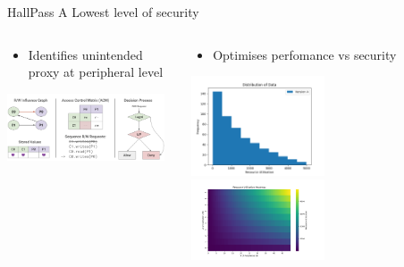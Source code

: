 \begin{frame}{HallPass A}
    Lowest level of security 
    \begin{columns}
        \begin{column}{0.5\textwidth}
            \begin{itemize}
                \item Identifies unintended proxy at peripheral level
            \end{itemize}
            \centering
            \includegraphics[height=0.95\textheight,width=0.95\textwidth,keepaspectratio]{images/hallpass_a.png}
        \end{column}
       \begin{column}{0.5\textwidth}
            \begin{itemize}
                \item Optimises perfomance vs security
            \end{itemize}
            \centering
            \includegraphics[height=0.5\textheight,width=0.5\textwidth,keepaspectratio]{images/hallpass_a_hist.png}
            \includegraphics[height=0.5\textheight,width=0.5\textwidth,keepaspectratio]{images/hallpass_a_util.png}
       \end{column} 
    \end{columns}
\end{frame}